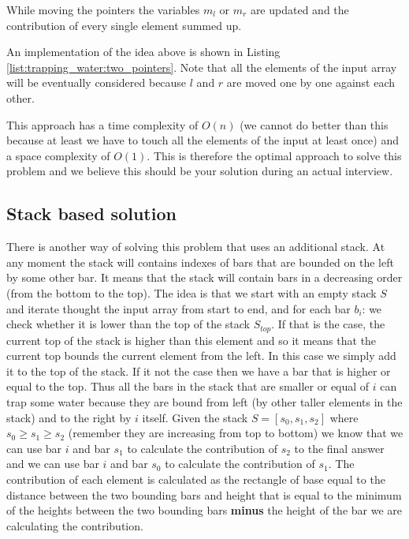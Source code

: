 While moving the pointers the variables $m_l$ or $m_r$ are updated and the contribution of every single element summed up.

An implementation of the idea above is shown in Listing \ref{list:trapping_water:two_pointers}. Note that all the elements of the input array will be eventually considered because $l$ and $r$ are moved one by one against each other. 



This approach has a time complexity of $O(n)$ (we cannot do better than this because at least we have to touch all the elements of the input at least once) and a space complexity of $O(1)$. This is therefore the optimal approach to solve this problem  and we believe this should be your solution during an actual interview.


\subsection{Stack based solution}
\label{trapping_water:sec:stack}
There is another way of solving this problem that uses an additional stack. At any moment the stack will contains indexes of bars that are bounded on the left by some other bar. It means that the stack will contain bars in a decreasing order (from the bottom to the top). The idea is that we start with an empty stack $S$ and iterate thought the input array from start to end, and for each bar $b_i$:
we check whether it is lower than the top of the stack $S_{top}$. If that is the case, the current top of the stack is higher than this element and so it means that the current top bounds the current element from the left. In this case we simply add it to the  top of the stack. If it not the case then we have a bar that is higher or equal to the top. Thus  all the bars in the stack that are smaller or equal of $i$ can trap some water because they are bound from left (by other taller elements in the stack) and to the right by $i$ itself.
Given the stack $S=[s_0, s_1,s_2]$ where $s_0 \geq s_1 \geq s_2$ (remember they are increasing from top to bottom) we know that we can use bar $i$ and bar $s_1$ to calculate the contribution of $s_2$ to the final answer and we can use bar $i$ and bar $s_0$ to calculate the contribution of $s_1$. The contribution of each element is calculated as the rectangle of base equal to the distance between the two bounding bars and height that is equal to the minimum of the heights between the two bounding bars \textbf{minus} the height of the bar we are calculating the contribution. 

